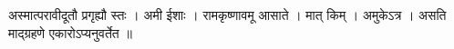 अस्मात्परावीदूतौ प्रगृह्यौ स्तः । अमी ईशाः । रामकृष्णावमू आसाते । मात्
किम् । अमुकेऽत्र । असति माद्ग्रहणे एकारोऽप्यनुवर्तेत ॥

